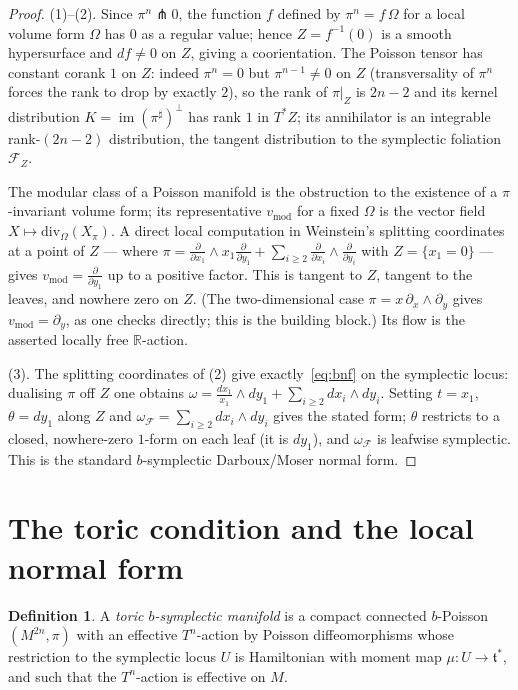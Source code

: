 \documentclass{amsart}
\theoremstyle{definition}
\newtheorem{definition}{Definition}
\begin{document}
\begin{proof}
(1)--(2). Since $\pi^n\pitchfork 0$, the function $f$ defined by
$\pi^n=f\,\Omega$ for a local volume form $\Omega$ has $0$ as a regular value;
hence $Z=f^{-1}(0)$ is a smooth hypersurface and $df\neq0$ on $Z$, giving a
coorientation. The Poisson tensor has constant corank $1$ on $Z$: indeed
$\pi^n=0$ but $\pi^{n-1}\neq0$ on $Z$ (transversality of $\pi^n$ forces the
rank to drop by exactly $2$), so the rank of $\pi|_Z$ is $2n-2$ and its kernel
distribution $K=\operatorname{im}(\pi^\sharp)^{\perp}$ has rank $1$ in $T^*Z$;
its annihilator is an integrable rank-$(2n-2)$ distribution, the tangent
distribution to the symplectic foliation $\mathcal F_Z$.

The modular class of a Poisson manifold is the obstruction to the existence of
a $\pi$-invariant volume form; its representative $v_{\mathrm{mod}}$ for a fixed
$\Omega$ is the vector field $X\mapsto \mathrm{div}_\Omega(X_\pi)$. A direct
local computation in Weinstein's splitting coordinates at a point of $Z$ ---
where $\pi=\frac{\partial}{\partial x_1}\wedge x_1\frac{\partial}{\partial
y_1}+\sum_{i\ge2}\frac{\partial}{\partial x_i}\wedge\frac{\partial}{\partial
y_i}$ with $Z=\{x_1=0\}$ --- gives $v_{\mathrm{mod}}=\frac{\partial}{\partial
y_1}$ up to a positive factor. This is tangent to $Z$, tangent to the leaves,
and nowhere zero on $Z$. (The two-dimensional case
$\pi=x\,\partial_x\wedge\partial_y$ gives $v_{\mathrm{mod}}=\partial_y$, as
one checks directly; this is the building block.) Its flow is the asserted
locally free $\mathbb R$-action.

(3). The splitting coordinates of (2) give exactly~\eqref{eq:bnf} on the
symplectic locus: dualising $\pi$ off $Z$ one obtains
$\omega=\frac{dx_1}{x_1}\wedge dy_1+\sum_{i\ge2}dx_i\wedge dy_i$. Setting
$t=x_1$, $\theta=dy_1$ along $Z$ and $\omega_{\mathcal F}=\sum_{i\ge2}dx_i\wedge
dy_i$ gives the stated form; $\theta$ restricts to a closed, nowhere-zero
$1$-form on each leaf (it is $dy_1$), and $\omega_{\mathcal F}$ is leafwise
symplectic. This is the standard $b$-symplectic Darboux/Moser normal form.
\end{proof}

\section{The toric condition and the local normal form}

\begin{definition}\label{def:toricb}
A \emph{toric $b$-symplectic manifold} is a compact connected $b$-Poisson
$(M^{2n},\pi)$ with an effective $T^n$-action by Poisson diffeomorphisms whose
restriction to the symplectic locus $U$ is Hamiltonian with moment map
$\mu\colon U\to\mathfrak t^*$, and such that the $T^n$-action is effective on
$M$.
\end{definition}
\end{document}
